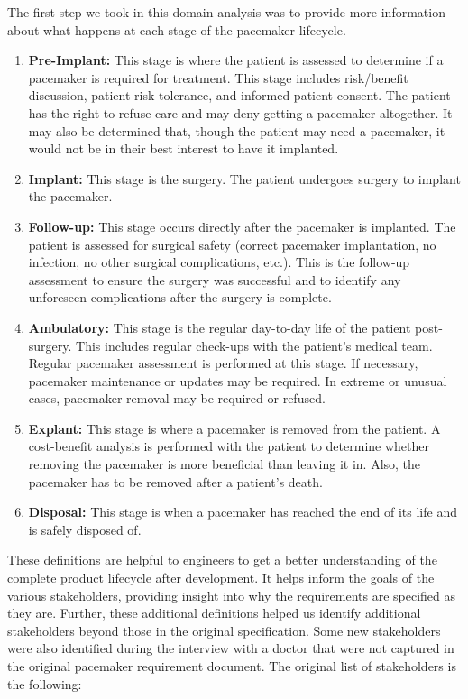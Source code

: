 The first step we took in this domain analysis was to provide more information about what happens at each stage of the pacemaker lifecycle.

\begin{enumerate}
	\item \textbf{Pre-Implant:} This stage is where the patient is assessed to determine if a pacemaker is required for treatment. This stage includes risk/benefit discussion, patient risk tolerance, and informed patient consent. The patient has the right to refuse care and may deny getting a pacemaker altogether. It may also be determined that, though the patient may need a pacemaker, it would not be in their best interest to have it implanted.
	\item \textbf{Implant:} This stage is the surgery. The patient undergoes surgery to implant the pacemaker.
	\item \textbf{Follow-up:} This stage occurs directly after the pacemaker is implanted. The patient is assessed for surgical safety (correct pacemaker implantation, no infection, no other surgical complications, etc.). This is the follow-up assessment to ensure the surgery was successful and to identify any unforeseen complications after the surgery is complete.
	\item \textbf{Ambulatory:} This stage is the regular day-to-day life of the patient post-surgery. This includes regular check-ups with the patient's medical team. Regular pacemaker assessment is performed at this stage. If necessary, pacemaker maintenance or updates may be required. In extreme or unusual cases, pacemaker removal may be required or refused.
	\item \textbf{Explant:} This stage is where a pacemaker is removed from the patient. A cost-benefit analysis is performed with the patient to determine whether removing the pacemaker is more beneficial than leaving it in. Also, the pacemaker has to be removed after a patient's death.
	\item \textbf{Disposal:} This stage is when a pacemaker has reached the end of its life and is safely disposed of.
\end{enumerate}

These definitions are helpful to engineers to get a better understanding of the complete product lifecycle after development. It helps inform the goals of the various stakeholders, providing insight into why the requirements are specified as they are. Further, these additional definitions helped us identify additional stakeholders beyond those in the original specification. Some new stakeholders were also identified during the interview with a doctor that were not captured in the original pacemaker requirement document. The original list of stakeholders is the following:

